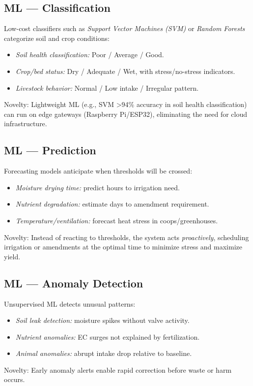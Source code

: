 \documentclass{sigchi}
\begin{document}
\subsection{ML — Classification}

Low-cost classifiers such as \emph{Support Vector Machines (SVM)} or \emph{Random Forests} categorize soil and crop conditions:
\begin{itemize}
\item \emph{Soil health classification:} Poor / Average / Good.
\item \emph{Crop/bed status:} Dry / Adequate / Wet, with stress/no-stress indicators.
\item \emph{Livestock behavior:} Normal / Low intake / Irregular pattern.
\end{itemize}

Novelty: Lightweight ML (e.g., SVM >94\% accuracy in soil health classification) can run on edge gateways (Raspberry Pi/ESP32), eliminating the need for cloud infrastructure.

\subsection{ML — Prediction}
Forecasting models anticipate when thresholds will be crossed:
\begin{itemize}
\item \emph{Moisture drying time:} predict hours to irrigation need.
\item \emph{Nutrient degradation:} estimate days to amendment requirement.
\item \emph{Temperature/ventilation:} forecast heat stress in coops/greenhouses.
\end{itemize}
Novelty: Instead of reacting to thresholds, the system acts \emph{proactively}, scheduling irrigation or amendments at the optimal time to minimize stress and maximize yield.

\subsection{ML — Anomaly Detection}
Unsupervised ML detects unusual patterns:
\begin{itemize}
\item \emph{Soil leak detection:} moisture spikes without valve activity.
\item \emph{Nutrient anomalies:} EC surges not explained by fertilization.
\item \emph{Animal anomalies:} abrupt intake drop relative to baseline.
\end{itemize}
Novelty: Early anomaly alerts enable rapid correction before waste or harm occurs.
\end{document}
